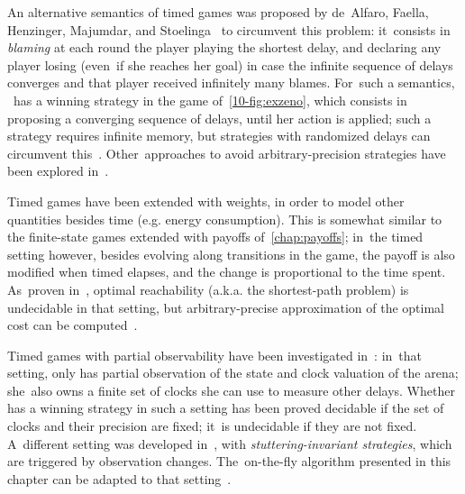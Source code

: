 An alternative semantics of timed games was proposed by de~Alfaro,
Faella, Henzinger, Majumdar, and Stoelinga~\cite{AFHMS03} to
circumvent this problem: it~consists in \emph{blaming} at each round
the player playing the shortest delay, and declaring any player losing
(even~if she reaches her goal) in case the infinite sequence of delays
converges and that player received infinitely many blames.  For~such a
semantics, \Eve~has a winning strategy in the game
of~\cref{10-fig:exzeno}, which consists in proposing a converging
sequence of delays, until her action is applied; such a strategy
requires infinite memory, but strategies with randomized delays can
circumvent this~\cite{CHP08}. Other~approaches to avoid
arbitrary-precision strategies have been explored
in~\cite{BMS15,BFM15,LLTW14,ORS14}.

Timed games have been extended with weights, in order to model other
quantities besides time (e.g. energy consumption). This is somewhat
similar to the finite-state games extended with payoffs
of~\cref{chap:payoffs}; in~the timed setting however, besides evolving
along transitions in the game, the payoff is also modified when timed
elapses, and the change is proportional to the time spent. As~proven
in~\cite{BBR05,BBM06}, optimal reachability (a.k.a. the shortest-path
problem) is undecidable in that setting, but arbitrary-precise
approximation of the optimal cost can be computed~\cite{BJM15}.


Timed games with partial observability have been investigated
in~\cite{BDMP03}: in~that setting, \Eve only has partial observation
of the state and clock valuation of the arena; she~also owns a finite
set of clocks she can use to measure other delays. Whether \Eve has a
winning strategy in such a setting has been proved decidable if the
set of clocks and their precision are fixed; it~is undecidable if they
are not fixed.
%
A~different setting was developed in~\cite{CDLLR07}, with
\emph{stuttering-invariant strategies}, which are triggered by
observation changes. The~on-the-fly algorithm presented in this
chapter can be adapted to that setting~\cite{CDLLR07}. 

